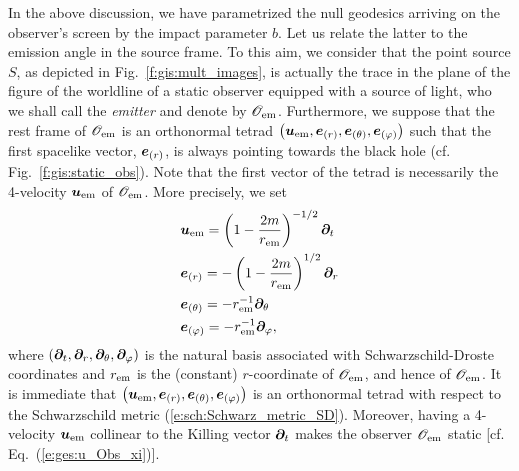 In the above discussion, we have parametrized the null geodesics arriving
on the observer's screen by the impact parameter $b$. Let us relate the latter
to the emission angle in the source frame. To this aim, we consider that
the point source $S$, as depicted in Fig.~\ref{f:gis:mult_images}, is actually
the trace in the plane of the figure of the worldline of a static observer equipped
with a source of light, who we shall call the \emph{emitter} and denote
by $\mathscr{O}_{\rm em}$. Furthermore, we suppose that the rest frame of $\mathscr{O}_{\rm em}$
is an orthonormal tetrad
$\left(\bm{u}_{\rm em}, \bm{e}_{(r)}, \bm{e}_{(\theta)}, \bm{e}_{(\varphi)}\right)$ such
that the first spacelike vector, $\bm{e}_{(r)}$, is always pointing towards the
black hole (cf. Fig.~\ref{f:gis:static_obs}).
Note that the first vector of the tetrad is necessarily the
4-velocity $\bm{u}_{\rm em}$ of $\mathscr{O}_{\rm em}$. More precisely, we set
\begin{subequations}
\label{e:gis:bo_Obs_em}
\begin{align}
& \bm{u}_{\rm em} = \left( 1 - \frac{2m}{r_{\rm em}} \right)^{-1/2} \bm{\partial}_t \\
& \bm{e}_{(r)} = - \left( 1 - \frac{2m}{r_{\rm em}} \right)^{1/2} \bm{\partial}_r \\
& \bm{e}_{(\theta)} = - r_{\rm em}^{-1} \bm{\partial}_\theta \\
& \bm{e}_{(\varphi)} = - r_{\rm em}^{-1} \bm{\partial}_\varphi ,
\end{align}
\end{subequations}
where $(\bm{\partial}_t, \bm{\partial}_r, \bm{\partial}_\theta, \bm{\partial}_\varphi)$ is the natural basis associated
with Schwarzschild-Droste coordinates and $r_{\rm em}$ is the (constant) $r$-coordinate of
$\mathscr{O}_{\rm em}$, and hence of $\mathscr{O}_{\rm em}$.
It is immediate that $\left(\bm{u}_{\rm em}, \bm{e}_{(r)}, \bm{e}_{(\theta)}, \bm{e}_{(\varphi)}\right)$
is an orthonormal tetrad with respect to the Schwarzschild metric
(\ref{e:sch:Schwarz_metric_SD}). Moreover,
having a 4-velocity $\bm{u}_{\rm em}$ collinear to the Killing vector $\bm{\partial}_t$
makes the observer $\mathscr{O}_{\rm em}$ static [cf. Eq.~(\ref{e:ges:u_Obs_xi})].

